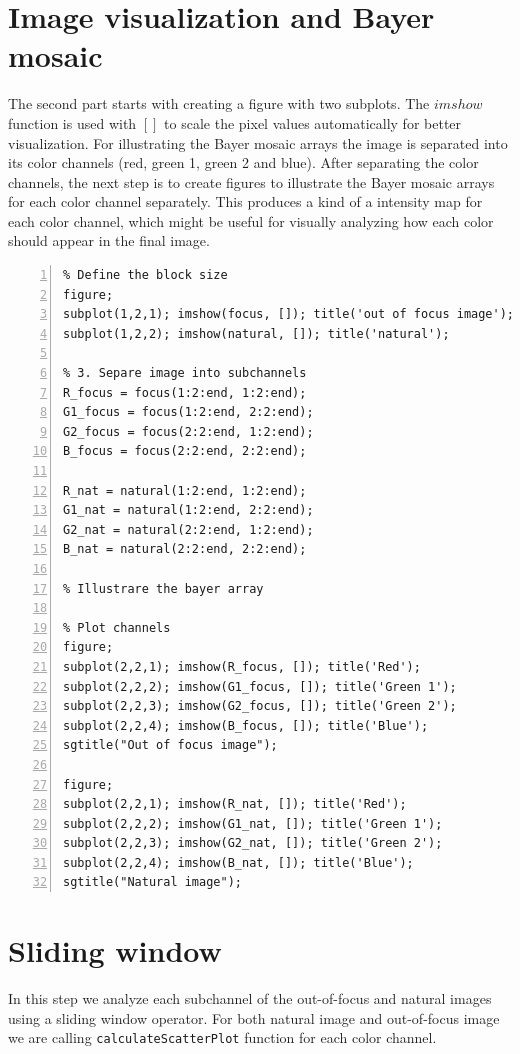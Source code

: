 \documentclass[12pt,a4paper,english
]{tunithesis}
\begin{document}
\section{Image visualization and Bayer mosaic}
The second part starts with creating a figure with two subplots. The $imshow$ function is used with $[]$ to scale the pixel values automatically for better visualization. For illustrating the Bayer mosaic arrays the image is separated into its color channels (red, green 1, green 2 and blue). After separating the color channels, the next step is to create figures to illustrate the Bayer mosaic arrays for each color channel separately. This produces a kind of a intensity map for each color channel, which might be useful for visually analyzing how each color should appear in the final image.
\begin{lstlisting}[style=Matlab-editor, numbers=left, basicstyle=\small]
% 2. Visualize Images, Bayer mosaic array
% Define the block size
figure;
subplot(1,2,1); imshow(focus, []); title('out of focus image');
subplot(1,2,2); imshow(natural, []); title('natural');

% 3. Separe image into subchannels
R_focus = focus(1:2:end, 1:2:end);
G1_focus = focus(1:2:end, 2:2:end);
G2_focus = focus(2:2:end, 1:2:end);
B_focus = focus(2:2:end, 2:2:end);

R_nat = natural(1:2:end, 1:2:end);
G1_nat = natural(1:2:end, 2:2:end);
G2_nat = natural(2:2:end, 1:2:end);
B_nat = natural(2:2:end, 2:2:end);

% Illustrare the bayer array

% Plot channels
figure;
subplot(2,2,1); imshow(R_focus, []); title('Red');
subplot(2,2,2); imshow(G1_focus, []); title('Green 1');
subplot(2,2,3); imshow(G2_focus, []); title('Green 2');
subplot(2,2,4); imshow(B_focus, []); title('Blue');
sgtitle("Out of focus image");

figure;
subplot(2,2,1); imshow(R_nat, []); title('Red');
subplot(2,2,2); imshow(G1_nat, []); title('Green 1');
subplot(2,2,3); imshow(G2_nat, []); title('Green 2');
subplot(2,2,4); imshow(B_nat, []); title('Blue');
sgtitle("Natural image");
\end{lstlisting}
\section{Sliding window}
In this step we analyze each subchannel of the out-of-focus and natural images using a sliding window operator. For both natural image and out-of-focus image we are calling \texttt{calculateScatterPlot} function for each color channel.
\end{document}
